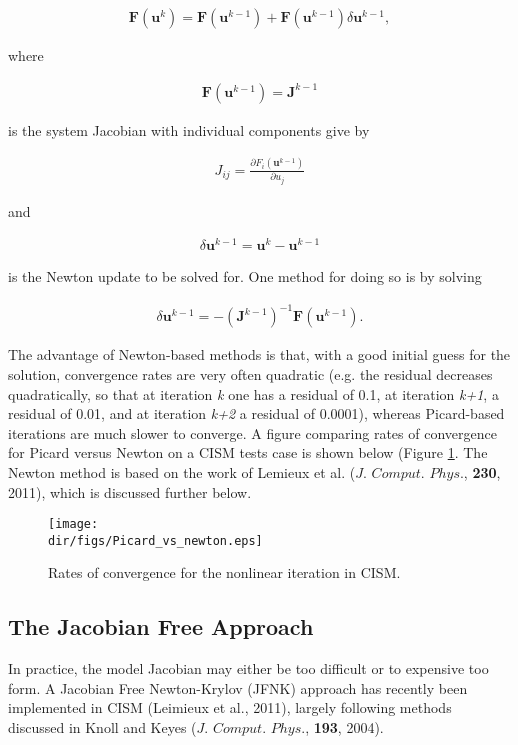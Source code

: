 \begin{align*}
\mathbf{F}(\mathbf{u}^{k})=\mathbf{F}(\mathbf{u}^{k-1})+\mathbf{F}(\mathbf{u}^{k-1})\delta \mathbf{u}^{k-1},
\end{align*}

where

\begin{align*}
\mathbf{F}(\mathbf{u}^{k-1})=\mathbf{J}^{k-1}
\end{align*}

is the system Jacobian with individual components give by

\begin{align*}
J_{ij}=\frac{\partial F_{i}(\mathbf{u}^{k-1})}{\partial u_{j}}
\end{align*}

and 

\begin{align*}
\delta \mathbf{u}^{k-1}=\mathbf{u}^{k}-\mathbf{u}^{k-1}
\end{align*}

is the Newton update to be solved for. One method for doing so is by solving 

\begin{align*}
\delta \mathbf{u}^{k-1}=-\left( \mathbf{J}^{k-1} \right)^{-1}\mathbf{F}(\mathbf{u}^{k-1}).
\end{align*}

The advantage of Newton-based methods is that, with a good initial guess for the solution, convergence rates are very often quadratic (e.g. the residual decreases quadratically, so that at iteration \textit{k} one has a residual of 0.1, at iteration \textit{k+1}, a residual of 0.01, and at iteration \textit{k+2} a residual of 0.0001), whereas Picard-based iterations are much slower to converge. A figure comparing rates of convergence for Picard versus Newton on a CISM tests case is shown below (Figure \ref{fig:jfnk}. The Newton method is based on the work of Lemieux et al. ($J.$ $Comput.$ $Phys.$, \textbf{230}, 2011), which is discussed further below.

\begin{figure}
  \begin{center}
    \texttt{[image: \\dir/figs/Picard\_vs\_newton.eps]}
  \end{center}
  \caption{Rates of convergence for the nonlinear iteration in CISM.}
  \label{fig:jfnk}
\end{figure} 

\subsection{The Jacobian Free Approach}
In practice, the model Jacobian may either be too difficult or to expensive too form. A Jacobian Free Newton-Krylov (JFNK) approach has recently been implemented in CISM (Leimieux et al., 2011), largely following methods discussed in Knoll and Keyes ($J.$ $Comput.$ $Phys.$, \textbf{193}, 2004).


